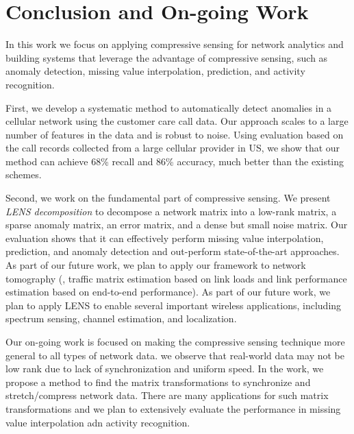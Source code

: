 \chapter{Conclusion and On-going Work}
\label{chp:conclusion}
In this work we focus on applying compressive sensing for network analytics and building systems that leverage the advantage of compressive sensing, such as anomaly detection, missing value interpolation, prediction, and activity recognition.

First, we develop a systematic method to automatically detect anomalies in a
cellular network using the customer care call data. Our approach scales to a
large number of features in the data and is robust to 
noise. Using evaluation based on the call records collected from a
large cellular provider in US, we show that our method can
achieve 68\% recall and 86\% accuracy, much better than the existing
schemes.

Second, we work on the fundamental part of compressive sensing. We present {\em LENS decomposition} to decompose a network matrix into a low-rank matrix, a sparse
anomaly matrix, an error matrix, and a dense but small noise matrix. Our
evaluation shows that it can effectively perform missing value
interpolation, prediction, and anomaly detection and out-perform
state-of-the-art approaches. As part of our future work, we plan to
apply our framework to network tomography (\eg, traffic matrix
estimation based on link loads and link performance estimation based
on end-to-end performance). As part of our future work, we plan to
apply LENS to enable several important wireless applications,
including spectrum sensing, channel estimation, and localization.

 Our on-going work is focused on making the compressive sensing technique more general to all types of network data. we observe that real-world data may not be low rank due to lack of synchronization and uniform speed. In the work, we propose a method to find the matrix transformations to synchronize and stretch/compress network data. There are many applications for such matrix transformations and we plan to extensively evaluate the performance in missing value interpolation adn activity recognition.

